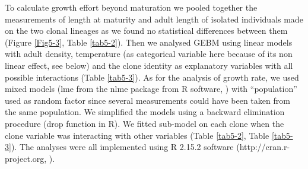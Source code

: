 To calculate growth effort beyond maturation we pooled together the measurements
of length at maturity and adult length of isolated individuals made on the two
clonal lineages as we found no statistical differences between them (Figure \ref{Fig5-3},
Table \ref{tab5-2}). Then we analysed GEBM using linear models with adult density,
temperature (as categorical variable here because of its non linear effect, see
below) and the clone identity as explanatory variables with all possible
interactions (Table \ref{tab5-3}). As for the analysis of growth rate, we used mixed models
(lme from the nlme package from R software, \citealp{pinheiro2000a}) with
“population” used as random factor since several measurements could have been
taken from the same population. We simplified the models using a backward
elimination procedure (drop function in R). We fitted sub-model on each clone
when the clone variable was interacting with other variables (Table \ref{tab5-2}, Table \ref{tab5-3}).
The analyses were all implemented using R 2.15.2 software
(http://cran.r-project.org, \citealp{ihaka1996a}).


